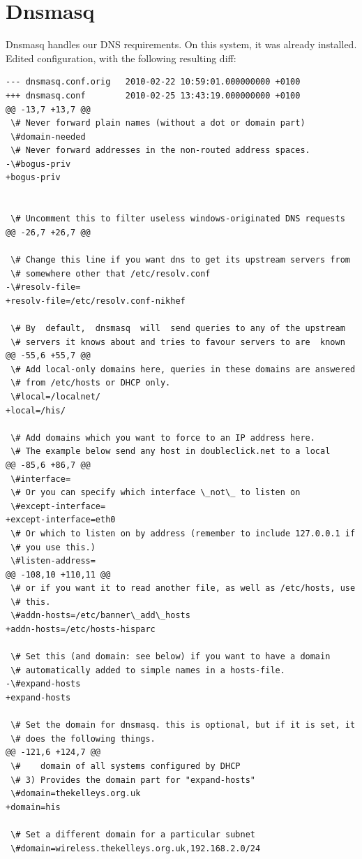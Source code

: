 \documentclass[a4paper,11pt,english]{sphinxmanual}
\begin{document}
\section{Dnsmasq}
\label{tietar:dnsmasq}
Dnsmasq handles our DNS requirements.  On this system, it was already
installed.  Edited configuration, with the following resulting diff:

\begin{Verbatim}[commandchars=\\\{\}]
--- dnsmasq.conf.orig   2010-02-22 10:59:01.000000000 +0100
+++ dnsmasq.conf        2010-02-25 13:43:19.000000000 +0100
@@ -13,7 +13,7 @@
 \# Never forward plain names (without a dot or domain part)
 \#domain-needed
 \# Never forward addresses in the non-routed address spaces.
-\#bogus-priv
+bogus-priv


 \# Uncomment this to filter useless windows-originated DNS requests
@@ -26,7 +26,7 @@

 \# Change this line if you want dns to get its upstream servers from
 \# somewhere other that /etc/resolv.conf
-\#resolv-file=
+resolv-file=/etc/resolv.conf-nikhef

 \# By  default,  dnsmasq  will  send queries to any of the upstream
 \# servers it knows about and tries to favour servers to are  known
@@ -55,6 +55,7 @@
 \# Add local-only domains here, queries in these domains are answered
 \# from /etc/hosts or DHCP only.
 \#local=/localnet/
+local=/his/

 \# Add domains which you want to force to an IP address here.
 \# The example below send any host in doubleclick.net to a local
@@ -85,6 +86,7 @@
 \#interface=
 \# Or you can specify which interface \_not\_ to listen on
 \#except-interface=
+except-interface=eth0
 \# Or which to listen on by address (remember to include 127.0.0.1 if
 \# you use this.)
 \#listen-address=
@@ -108,10 +110,11 @@
 \# or if you want it to read another file, as well as /etc/hosts, use
 \# this.
 \#addn-hosts=/etc/banner\_add\_hosts
+addn-hosts=/etc/hosts-hisparc

 \# Set this (and domain: see below) if you want to have a domain
 \# automatically added to simple names in a hosts-file.
-\#expand-hosts
+expand-hosts

 \# Set the domain for dnsmasq. this is optional, but if it is set, it
 \# does the following things.
@@ -121,6 +124,7 @@
 \#    domain of all systems configured by DHCP
 \# 3) Provides the domain part for "expand-hosts"
 \#domain=thekelleys.org.uk
+domain=his

 \# Set a different domain for a particular subnet
 \#domain=wireless.thekelleys.org.uk,192.168.2.0/24
\end{Verbatim}
\end{document}
